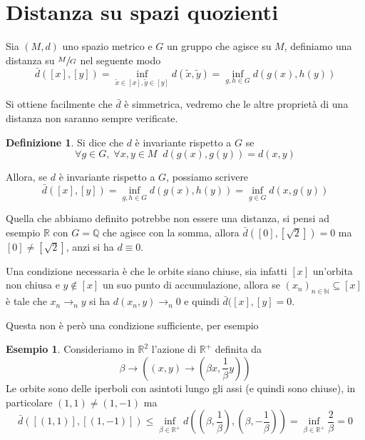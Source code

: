 \documentclass[a4paper,10pt]{article}
\newcounter{counter1}
\theoremstyle{plain}
\theoremstyle{definition}
\newtheorem{mydef}[counter1]{Definizione}
\newtheorem{myes}[counter1]{Esempio}
\theoremstyle{remark}
\newtheorem{mynot}[counter1]{Nota}
\newcommand{\pa}[1]{\left(#1\right)}
\newcommand{\bra}[1]{\left[#1\right]}
\begin{document}




\section{Distanza su spazi quozienti}

Sia $(M,d)$ uno spazio metrico e $G$ un gruppo che agisce su $M$,
definiamo una distanza su $\sfrac{M}{G}$ nel seguente modo
\[ \bar d (\bra{x}, \bra{y}) = \inf _{\tilde x \in \bra{x} , \tilde y
  \in \bra {y}} d(\tilde x , \tilde y) = \inf _ {g,h \in G} d(g(x),
h(y)) \]

Si ottiene facilmente che $\bar d$ è simmetrica, vedremo che le altre
proprietà di una distanza non saranno sempre verificate.

\begin{mydef}
  Si dice che $d$ è invariante rispetto a $G$ se
\[ \forall g \in G,\; \forall x,y \in M \;\; d(g(x),g(y)) = d(x,y) \]
\end{mydef}

Allora, se $d$ è invariante rispetto a $G$, possiamo scrivere
\[ \bar d (\bra{x}, \bra{y}) = \inf _ {g,h \in G} d(g(x), h(y)) =
\inf _{g \in G} d(x,g(y)) \]

Quella che abbiamo definito potrebbe non essere una distanza, si pensi
ad esempio $\mathbb{R}$ con $G = \mathbb{Q}$ che agisce con la somma,
allora $\bar d \pa{ \bra{0} , \bra{\sqrt{2}} } = 0$ ma $\bra{0} \neq
\bra{\sqrt{2}}$, anzi si ha $d \equiv 0$.

Una condizione necessaria è che le orbite siano chiuse, sia infatti
$\bra{x}$ un'orbita non chiusa e $y \not\in \bra{x}$ un suo punto di
accumulazione, allora se $\pa{ x_n} _{n \in \mathbb{N}} \subseteq
\bra{x}$ è tale che $x_n \to _n y$ si ha $d(x_n,y) \to _n 0$ e quindi
$\bar d(\bra{x},\bra{y} = 0$.

Questa non è però una condizione sufficiente, per esempio
\begin{myes}
  Consideriamo in $\mathbb{R}^2$ l'azione di $\mathbb{R}^+$ definita
  da
  \[ \beta \to \pa{ \pa{x,y} \to \pa{\beta x , \frac{1}{\beta}y } } \]
  Le orbite sono delle iperboli con asintoti lungo gli assi (e quindi
  sono chiuse), in particolare $\pa{1,1} \neq \pa{1,-1}$ ma
  \[ \bar d( \bra{ \pa{ 1,1} } , \bra{ \pa {1, -1}} ) \le \inf _{\beta
    \in \mathbb{R}^+ } d\pa{ \pa{ \beta , \frac{1}{\beta} } , \pa{
      \beta , - \frac{1}{\beta}} } = \inf _{ \beta \in \mathbb{R}^+ }
  \frac{2}{\beta} = 0 \]
\end{myes}
\end{document}
